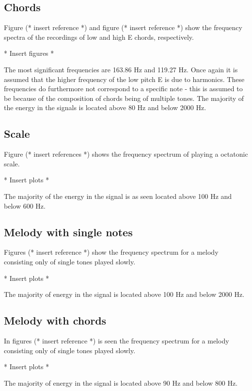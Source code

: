 \subsection{Chords}
Figure (* insert reference *) and figure (* insert reference *) show the frequency spectra of the recordings of low and high E chords, respectively.
\begin{center}
* Insert figures *
\end{center}

The most significant frequencies are 163.86 Hz and 119.27 Hz. Once again it is assumed that the higher frequency of the low pitch E is due to harmonics. These frequencies do furthermore not correspond to a specific note - this is assumed to be because of the composition of chords being of multiple tones. The majority of the energy in the signals is located above 80 Hz and below 2000 Hz.

\subsection{Scale}
Figure (* insert references *) shows the frequency spectrum of playing a octatonic scale.
\begin{center}
* Insert plots *
\end{center}

The majority of the energy in the signal is as seen located above 100 Hz and below 600 Hz.

\subsection{Melody with single notes}
Figures (* insert reference *) show the frequency spectrum for a melody consisting only of single tones played slowly.
\begin{center}
* Insert plots *
\end{center}

The majority of energy in the signal is located above 100 Hz and below 2000 Hz.

\subsection{Melody with chords}
In figures (* insert reference *) is seen the frequency spectrum for a melody consisting only of single tones played slowly.
\begin{center}
* Insert plots *
\end{center}

The majority of energy in the signal is located above 90 Hz and below 800 Hz.

